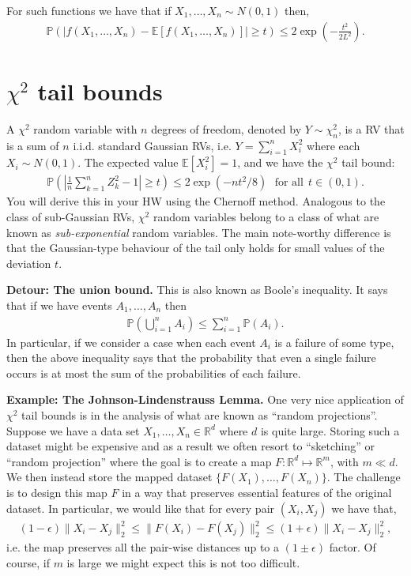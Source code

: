 \documentclass[twoside,12pt]{article}
\begin{document}
For such functions we have that if $X_1,\ldots,X_n \sim N(0,1)$ then,
\begin{align*}
\mathbb{P}(|f(X_1,\ldots,X_n) - \mathbb{E}[f(X_1,\ldots,X_n)] | \geq t) \leq 2 \exp \left( - \frac{t^2}{2L^2} \right).
\end{align*}

\section{$\chi^2$ tail bounds}
A $\chi^2$ random variable with $n$ degrees of freedom, denoted by $Y \sim \chi^2_n$, is a RV that is a sum of $n$ i.i.d. standard Gaussian RVs, i.e. $Y = \sum_{i=1}^n X_i^2$ where each $X_i \sim N(0,1)$. The expected value $\mathbb{E}[X_i^2] = 1$, and we have the $\chi^2$ tail bound:
\begin{align*}
\mathbb{P} \left(\left| \frac{1}{n} \sum_{k=1}^n Z_k^2 - 1 \right| \geq t\right) \leq 2 \exp (-nt^2/8)~~~\text{for all}~~t \in (0,1).
\end{align*}
You will derive this in your HW using the Chernoff method. Analogous to the class of sub-Gaussian RVs, $\chi^2$ random variables belong to a class of what are known as \emph{sub-exponential} random variables. The main note-worthy difference is that the Gaussian-type behaviour of the tail only holds for small values of the deviation $t$.

{\bf Detour: The union bound. } This is also known as Boole's inequality. It says that if we have events $A_1,\ldots,A_n$ then 
\begin{align*}
\mathbb{P}\left( \bigcup_{i=1}^n A_i\right) \leq \sum_{i=1}^n \mathbb{P}(A_i).
\end{align*}
In particular, if we consider a case when each event $A_i$ is a failure of some type, then the above inequality says that the probability that even a single failure occurs is at most the sum of the probabilities of each failure. 

{\bf Example: The Johnson-Lindenstrauss Lemma. } One very nice application of $\chi^2$ tail bounds is in the analysis of what are known as ``random projections''. Suppose we have a data set $X_1,\ldots,X_n \in \mathbb{R}^d$ where $d$ is quite large. Storing such a dataset might be expensive and as a result we often resort to ``sketching'' or ``random projection'' where the goal is to create a map $F: \mathbb{R}^d \mapsto \mathbb{R}^m$, with $m \ll d$. We then instead store the mapped dataset $\{F(X_1),\ldots,F(X_n)\}$. The challenge is to design this map $F$ in a way that preserves essential features of the original dataset. In particular, we would like that for every pair $(X_i,X_j)$ we have that,
\begin{align*}
(1 - \epsilon) \|X_i - X_j\|_2^2 \leq \|F(X_i) - F(X_j)\|_2^2 \leq (1+\epsilon) \|X_i - X_j\|_2^2,
\end{align*}
i.e. the map preserves all the pair-wise distances up to a $(1 \pm \epsilon)$ factor. Of course, if $m$ is large we might expect this is not too difficult.
\end{document}

